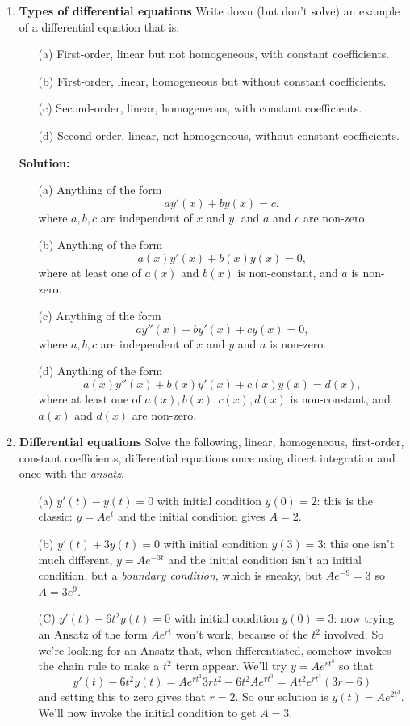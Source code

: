 \documentclass[11pt,a4paper]{scrartcl}
\begin{document}
\begin{enumerate}
  
\item \textbf{Types of differential equations}
  Write down (but don't solve) an example of a differential equation that is:
  \begin{itemize}
  \item[(a)] First-order, linear but not homogeneous, with constant coefficients.
  \item[(b)] First-order, linear, homogeneous but without constant coefficients.
  \item[(c)] Second-order, linear, homogeneous, with constant coefficients.
  \item[(d)] Second-order, linear, not homogeneous, without constant coefficients.
  \end{itemize}
	\textbf{Solution:}
	\begin{itemize}
		\item[(a)] Anything of the form
		\[ay'(x) + by(x) = c,\]
		where $a,b,c$ are independent of $x$ and $y$, and $a$ and $c$ are non-zero.
		\item[(b)] Anything of the form
		\[a(x)y'(x) + b(x)y(x) = 0,\]
		where at least one of $a(x)$ and $b(x)$ is non-constant, and $a$ is non-zero.
		\item[(c)] Anything of the form
		\[ay''(x) + by'(x) + cy(x) = 0,\]
		where $a,b,c$ are independent of $x$ and $y$ and $a$ is non-zero.
		\item[(d)] Anything of the form
		\[a(x)y''(x) + b(x)y'(x) + c(x)y(x) = d(x),\]
		where at least one of $a(x), b(x), c(x), d(x)$ is non-constant, and
		$a(x)$ and $d(x)$ are non-zero.
	\end{itemize}


  
\item \textbf{Differential equations} Solve the following, linear,
  homogeneous, first-order, constant coefficients, differential
  equations once using direct integration and once with the
  \emph{ansatz}.
	\begin{itemize}
		\item[(a)] $y'(t) - y(t) = 0$ with initial condition $y(0) = 2$: this is the classic: $y=Ae^{t}$ and the initial condition gives $A=2$.
		\item[(b)] $y'(t) + 3y(t) = 0$ with initial condition $y(3) = 3$: this one isn't much different, $y=Ae^{-3t}$ and the initial condition isn't an initial condition, but a \emph{boundary condition}, which is sneaky, but $Ae^{-9}=3$ so $A=3e^{9}$.
		\item[(C)] $y'(t) - 6t^2y(t) = 0$ with initial condition $y(0) = 3$: now trying an Ansatz of the form $Ae^{rt}$ won't work, because of the $t^2$ involved. So we're looking for an Ansatz that, when differentiated, somehow invokes the chain rule to make a $t^2$ term appear. We'll try $y = Ae^{rt^3}$ so that 
        \[
        y'(t) - 6t^2 y(t) = Ae^{rt^3}3rt^2 - 6t^2Ae^{rt^3} = At^2e^{rt^3}(3r - 6)
        \]
        and setting this to zero gives that $r=2$. So our solution is $y(t) = Ae^{2t^3}$. We'll now invoke the initial condition to get $A=3$.
	\end{itemize}
    

\end{enumerate}
\end{document}
